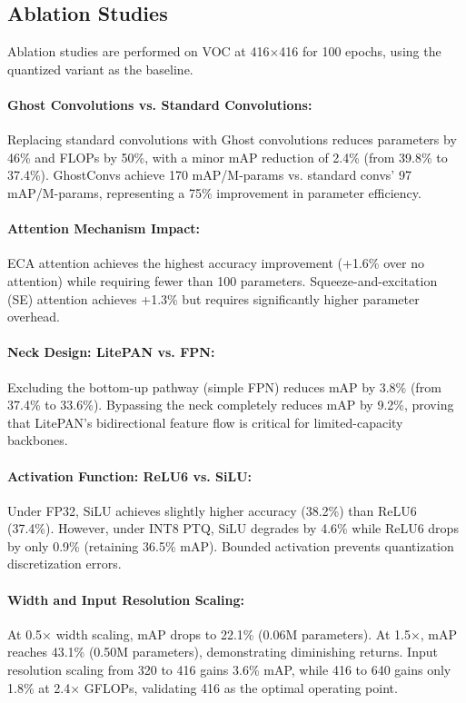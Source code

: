 \documentclass[article,submit,moreauthors,pdftex,10pt,a4paper]{article}
\begin{document}
\subsection{Ablation Studies}
Ablation studies are performed on VOC at 416$\times$416 for 100 epochs, using the quantized variant as the baseline.

\paragraph{Ghost Convolutions vs. Standard Convolutions:}
Replacing standard convolutions with Ghost convolutions reduces parameters by 46\% and FLOPs by 50\%, with a minor mAP reduction of 2.4\% (from 39.8\% to 37.4\%). GhostConvs achieve 170 mAP/M-params vs. standard convs' 97 mAP/M-params, representing a 75\% improvement in parameter efficiency.

\paragraph{Attention Mechanism Impact:}
ECA attention achieves the highest accuracy improvement (+1.6\% over no attention) while requiring fewer than 100 parameters. Squeeze-and-excitation (SE) attention achieves +1.3\% but requires significantly higher parameter overhead.

\paragraph{Neck Design: LitePAN vs. FPN:}
Excluding the bottom-up pathway (simple FPN) reduces mAP by 3.8\% (from 37.4\% to 33.6\%). Bypassing the neck completely reduces mAP by 9.2\%, proving that LitePAN's bidirectional feature flow is critical for limited-capacity backbones.

\paragraph{Activation Function: ReLU6 vs. SiLU:}
Under FP32, SiLU achieves slightly higher accuracy (38.2\%) than ReLU6 (37.4\%). However, under INT8 PTQ, SiLU degrades by 4.6\% while ReLU6 drops by only 0.9\% (retaining 36.5\% mAP). Bounded activation prevents quantization discretization errors.

\paragraph{Width and Input Resolution Scaling:}
At 0.5$\times$ width scaling, mAP drops to 22.1\% (0.06M parameters). At 1.5$\times$, mAP reaches 43.1\% (0.50M parameters), demonstrating diminishing returns. Input resolution scaling from 320 to 416 gains 3.6\% mAP, while 416 to 640 gains only 1.8\% at 2.4$\times$ GFLOPs, validating 416 as the optimal operating point.
\end{document}
